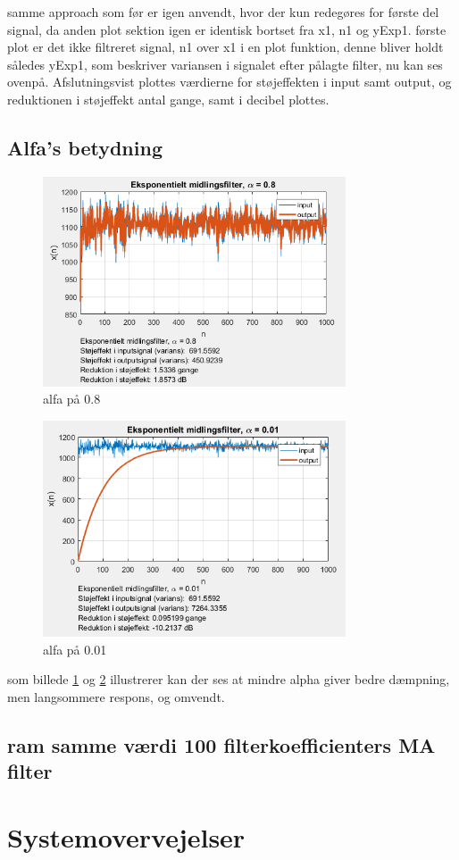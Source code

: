 \documentclass{article}
\begin{document}
samme approach som før er igen anvendt, hvor der kun redegøres for første del signal, da anden plot sektion igen er identisk bortset fra x1, n1 og yExp1.
første plot er det ikke filtreret signal, n1 over x1 i en plot funktion, denne bliver holdt således yExp1, som beskriver variansen i signalet efter pålagte filter, nu kan ses ovenpå.
Afslutningsvist plottes værdierne for støjeffekten i input samt output, og reduktionen i støjeffekt antal gange, samt i decibel plottes.


\subsection{Alfa's betydning}
\label{sec:alfa}

\begin{figure}[h!]
  \centering
  \includegraphics[width=0.8\textwidth]{rod/hoj_alfa.png}
  \caption{alfa på 0.8}
  \label{fig:høj_alfa}
\end{figure}

\begin{figure}[h!]
  \centering
  \includegraphics[width=0.8\textwidth]{rod/lav_alfa.png}
  \caption{alfa på 0.01}
  \label{fig:lav_alfa}
\end{figure}

som billede \ref{fig:høj_alfa} og \ref{fig:lav_alfa} illustrerer kan der ses at mindre alpha giver bedre dæmpning, men langsommere respons, og omvendt.

\subsection{ram samme værdi 100 filterkoefficienters MA filter}
\label{sec:ram}

\section{Systemovervejelser}
\label{sec:Systemovervejelser}
\end{document}

